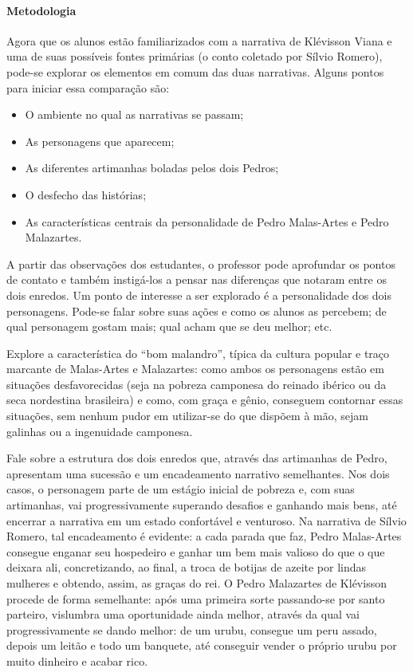 \documentclass[11pt]{extarticle}
\begin{document}
\paragraph{Metodologia} Agora que os alunos estão familiarizados com a narrativa de Klévisson Viana e uma de suas possíveis fontes primárias (o conto coletado por Sílvio Romero), pode-se explorar os elementos em comum das duas narrativas.
Alguns pontos para iniciar essa comparação são:

\begin{itemize}
\item O ambiente no qual as narrativas se passam;

\item As personagens que aparecem;

\item As diferentes artimanhas boladas pelos dois Pedros;

\item O desfecho das histórias;

\item As características centrais da personalidade de Pedro Malas-Artes e Pedro Malazartes.
\end{itemize}

A partir das observações dos estudantes, o professor pode aprofundar os pontos de contato e também instigá-los a pensar nas diferenças que notaram entre os dois enredos.
Um ponto de interesse a ser explorado é a personalidade dos dois personagens.
Pode-se falar sobre suas ações e como os alunos as percebem; de qual personagem gostam mais; qual acham que se deu melhor; etc.

Explore a característica do ``bom malandro'', típica da cultura popular e traço marcante de Malas-Artes e Malazartes: como ambos os personagens estão em situações desfavorecidas (seja na pobreza camponesa do reinado ibérico ou da seca nordestina brasileira) e como, com graça e gênio, conseguem contornar essas situações, sem nenhum pudor em utilizar-se do que dispõem à mão, sejam galinhas ou a ingenuidade camponesa.

Fale sobre a estrutura dos dois enredos que, através das artimanhas de Pedro, apresentam uma sucessão e um encadeamento narrativo semelhantes. Nos dois casos, o personagem parte de um estágio inicial de pobreza e, com suas artimanhas, vai progressivamente superando desafios e ganhando mais bens, até encerrar a narrativa em um estado confortável e venturoso. Na narrativa de Sílvio Romero, tal encadeamento é evidente: a cada parada que faz, Pedro Malas-Artes consegue enganar seu hospedeiro e ganhar um bem mais valioso do que o que deixara ali, concretizando, ao final, a troca de botijas de azeite por lindas mulheres e obtendo, assim, as graças do rei. O Pedro Malazartes de Klévisson procede de forma semelhante: após uma primeira sorte passando-se por santo parteiro, vislumbra uma oportunidade ainda melhor, através da qual vai progressivamente se dando melhor: de um urubu, consegue um peru assado, depois um leitão e todo um banquete, até conseguir vender o próprio urubu por muito dinheiro e acabar rico.
\end{document}
